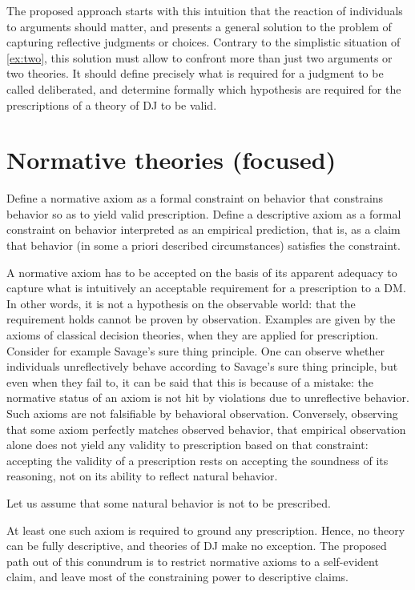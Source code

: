\documentclass[version=last, pagesize, twoside=off, bibliography=totoc, DIV=calc, fontsize=12pt, a4paper, french, english]{scrartcl}
\begin{document}
The proposed approach starts with this intuition that the reaction of individuals to arguments should matter, and presents a general solution to the problem of capturing reflective judgments or choices. Contrary to the simplistic situation of \cref{ex:two}, this solution must allow to confront more than just two arguments or two theories. It should define precisely what is required for a judgment to be called deliberated, and determine formally which hypothesis are required for the prescriptions of a theory of \ac{DJ} to be valid.

\section{Normative theories (focused)}
Define a normative axiom as a formal constraint on behavior that constrains behavior so as to yield valid prescription. 
Define a descriptive axiom as a formal constraint on behavior interpreted as an empirical prediction, that is, as a claim that behavior (in some a priori described circumstances) satisfies the constraint.

A normative axiom has to be accepted on the basis of its apparent adequacy to capture what is intuitively an acceptable requirement for a prescription to a \ac{DM}. In other words, it is not a hypothesis on the observable world: that the requirement holds cannot be proven by observation. Examples are given by the axioms of classical decision theories, when they are applied for prescription. Consider for example Savage’s sure thing principle. One can observe whether individuals unreflectively behave according to Savage’s sure thing principle, but even when they fail to, it can be said that this is because of a mistake: the normative status of an axiom is not hit by violations due to unreflective behavior. Such axioms are not falsifiable by behavioral observation. Conversely, observing that some axiom perfectly matches observed behavior, that empirical observation alone does not yield any validity to prescription based on that constraint: accepting the validity of a prescription rests on accepting the soundness of its reasoning, not on its ability to reflect natural behavior.

Let us assume that some natural behavior is not to be prescribed.

At least one such axiom is required to ground any prescription. Hence, no theory can be fully descriptive, and theories of \ac{DJ} make no exception. The proposed path out of this conundrum is to restrict normative axioms to a self-evident claim, and leave most of the constraining power to descriptive claims. 
\end{document}
